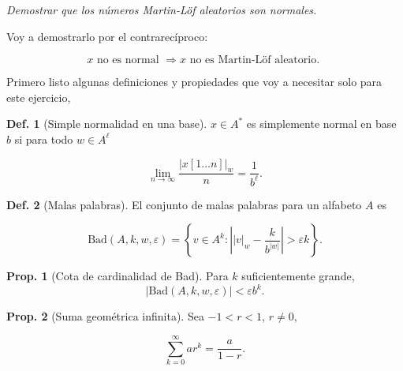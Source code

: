 \documentclass{article}
\theoremstyle{definition} %
\newtheorem{proposition}{Prop.}
\newtheorem{definition}{Def.}
\newcommand{\first}[2]{#2[1 \dots #1]}
\newcommand{\size}[1]{\left|#1\right|}
\newcommand{\ML}{Martin-Löf }
\newcommand{\occurrencesOf}[2]{|#2|_#1}
\newcommand{\Bad}[4]{\text{Bad}(#1, #2, #3, #4)}
\begin{document}
\textit{Demostrar que los números \ML aleatorios son normales.}

Voy a demostrarlo por el contrarecíproco:

\[
    x \text{ no es normal } \Rightarrow x \text{ no es \ML aleatorio. }
\]

Primero listo algunas definiciones y propiedades que voy a necesitar solo para
este ejercicio,

\begin{definition}[Simple normalidad en una base]\label{def:simple-norm}
    $x \in A^*$ es simplemente normal en base $b$ si para todo $w \in A^\ell$

    \[
        \lim_{n\to\infty}
            \frac{\occurrencesOf{w}{\first{n}{x}}}{n}
            = \frac{1}{b^\ell}.
    \]
\end{definition}

\begin{definition}[Malas palabras]\label{def:bad}
    El conjunto de malas palabras para un alfabeto $A$ es

    \[
        \Bad{A}{k}{w}{\varepsilon} = \left\{
            v \in A^k : \left|
                \occurrencesOf{w}{v} - \frac{k}{b^{|w|}}
            \right| > \varepsilon k
        \right\}.
    \]
\end{definition}

\begin{proposition}[Cota de cardinalidad de Bad]\label{prop:bad}
    Para $k$ suficientemente grande,
    \[
        \size{\Bad{A}{k}{w}{\varepsilon}} < \varepsilon b^k.
    \]
\end{proposition}

\begin{proposition}[Suma geométrica infinita]\label{prop:geom-inf-sum}
    Sea $-1 < r < 1$, $r \neq 0$,

    \[
        \sum_{k=0}^{\infty} ar^k
        = \frac{a}{1 - r}.
    \]
\end{proposition}
\end{document}
